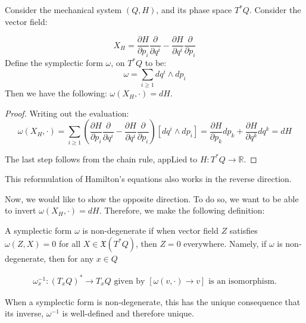 \begin{lemma}
\label{VecDefn}
Consider the mechanical system $(Q, H)$, and its phase space $T^{*} Q$. Consider the vector field: 

\begin{equation}
X_{H} = \frac{\partial H}{\partial p_{i}} \frac{\partial}{\partial q^{i}} - \frac{\partial H}{\partial q^{i}} \frac{\partial}{\partial p_{i}}
\end{equation}
\noindent Define the symplectic form $\omega$, on $T^{*} Q$ to be:
$$\omega = \sum_{i \geq 1} dq^{i} \wedge dp_{i}$$
\noindent Then we have the following: $\omega(X_{H}, \cdot) = dH$.
\end{lemma}

\begin{proof}
Writing out the evaluation: 
$$\omega(X_{H}, \cdot) = \sum_{i \geq 1} \left( \frac{\partial H}{\partial p_{i}} \frac{\partial}{\partial q^{i}} - \frac{\partial H}{\partial q^{i}} \frac{\partial}{\partial p_{i}} \right) \left[ dq^{i} \wedge dp_{i} \right] = \frac{\partial H}{\partial p_{k}} dp_{k} + \frac{\partial H}{\partial q^{k}} dq^{k} = dH $$

\noindent The last step follows from the chain rule, appLied to $H: T^{*} Q \to \mathbb{R}$.
\end{proof}

\begin{remark}
This reformulation of Hamilton's equations also works in the reverse direction. 
\end{remark}

Now, we would like to show the opposite direction. To do so, we want to be able to invert $\omega(X_{H}, \cdot) = dH$. Therefore, we make the following definition:

\begin{defn}
A symplectic form $\omega$ is non-degenerate if when vector field $Z$ satisfies $\omega(Z, X) = 0$ for all $X \in \mathfrak{X}(T^{*} Q)$, then $Z = 0$ everywhere. Namely, if $\omega$ is non-degenerate, then for any $x \in Q$

\begin{align}
\omega_{x}^{-1}: (T_{x} Q)^{*} \to T_{x} Q \text{ given by } \left [ \omega(v, \cdot) \to v \right] \text{ is an isomorphism}.
\end{align}
\end{defn}

\begin{remark}
When a symplectic form is non-degenerate, this has the unique consequence that its inverse, $\omega^{-1}$ is well-defined and therefore unique. 
\end{remark}

